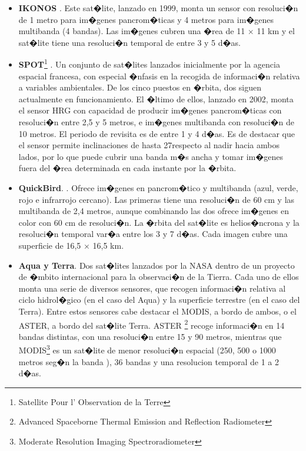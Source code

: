 \begin{itemize}
	Los sensores TM\footnote{Thematic Mapper} y MSS \footnote{Multispectral Scanner} se montan a bordo del sat�lite LANDSAT 5, todav�a en funcionamiento y con una resoluci�n temporal de 16 d�as. El sensor TM ofrece im�genes multibanda de 7 bandas con resoluci�n de 30 metros, excepto en la banda del infrarrojo t�rmico, donde la resoluci�n es de 120 metros. Las im�genes tienen un tama�o de 185 $\times$ 172 km.
	\item \textbf{IKONOS} \cite{webIkonos}. Este sat�lite, lanzado en 1999, monta un sensor con resoluci�n de 1 metro para im�genes pancrom�ticas y 4 metros para im�genes multibanda (4 bandas). Las im�genes cubren una �rea de 11 $\times$ 11 km y el sat�lite tiene una resoluci�n temporal de entre 3 y 5 d�as.
	\item \textbf{SPOT}\footnote{Satellite Pour l' Observation de la Terre} \cite{webSPOT}. Un conjunto de sat�lites lanzados inicialmente por la agencia espacial francesa, con especial �nfasis en la recogida de informaci�n relativa a variables ambientales. De los cinco puestos en �rbita, dos siguen actualmente en funcionamiento. El �ltimo de ellos, lanzado en 2002, monta el sensor HRG con capacidad de producir im�genes pancrom�ticas con resoluci�n entre 2,5 y 5 metros, e im�genes multibanda con resoluci�n de 10 metros. El periodo de revisita es de entre 1 y 4 d�as.
	Es de destacar que el sensor permite inclinaciones de hasta 27\degree respecto al nadir hacia ambos lados, por lo que puede cubrir una banda m�s ancha y tomar im�genes fuera del �rea determinada en cada instante por la �rbita.
	\item \textbf{QuickBird}. \cite{webQuickbird}. Ofrece im�genes en pancrom�tico y multibanda (azul, verde, rojo e infrarrojo cercano). Las primeras tiene una resoluci�n de 60 cm y las multibanda de 2,4 metros, aunque combinando las dos ofrece im�genes en color con 60 cm de resoluci�n. 
	La �rbita del sat�lite es helios�ncrona y la resoluci�n temporal var�a entre los 3 y 7 d�as. Cada imagen cubre una superficie de 16,5 $\times$ 16,5 km.
	\item \textbf{Aqua y Terra}. Dos sat�lites lanzados por la NASA dentro de un proyecto de �mbito internacional para la observaci�n de la Tierra. Cada uno de ellos monta una serie de diversos sensores, que recogen informaci�n relativa al ciclo hidrol�gico (en el caso del Aqua) y la superficie terrestre (en el caso del Terra). Entre estos sensores cabe destacar el MODIS, a bordo de ambos, o el ASTER, a bordo del sat�lite Terra. ASTER \footnote{Advanced Spaceborne Thermal Emission and Reflection Radiometer} recoge informaci�n en 14 bandas distintas, con una resoluci�n entre 15 y 90 metros, mientras que MODIS\footnote{Moderate Resolution Imaging Spectroradiometer} es un sat�lite de menor resoluci�n espacial (250, 500 o 1000 metros seg�n la banda ), 36 bandas y una resolucion temporal de 1 a 2 d�as. 


\end{itemize}
